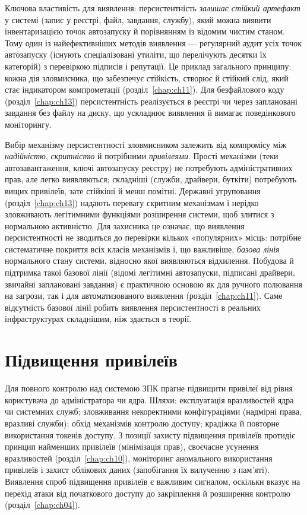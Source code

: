 Ключова властивість для виявлення: персистентність \emph{залишає стійкий артефакт} у системі (запис у реєстрі, файл, завдання, службу), який можна виявити інвентаризацією точок автозапуску й порівнянням із відомим чистим станом. Тому один із найефективніших методів виявлення --- регулярний аудит усіх точок автозапуску (існують спеціалізовані утиліти, що перелічують десятки їх категорій) з перевіркою підписів і репутації. Це приклад загального принципу: кожна дія зловмисника, що забезпечує стійкість, створює й стійкий слід, який стає індикатором компрометації (розділ~\ref{chap:ch11}). Для безфайлового коду (розділ~\ref{chap:ch13}) персистентність реалізується в реєстрі чи через заплановані завдання без файлу на диску, що ускладнює виявлення й вимагає поведінкового моніторингу.

Вибір механізму персистентності зловмисником залежить від компромісу між \emph{надійністю}, \emph{скритністю} й потрібними \emph{привілеями}. Прості механізми (теки автозавантаження, ключі автозапуску реєстру) не потребують адміністративних прав, але легко виявляються; складніші (служби, драйвери, буткіти) потребують вищих привілеїв, зате стійкіші й менш помітні. Державні угруповання (розділ~\ref{chap:ch13}) надають перевагу скритним механізмам і нерідко зловживають легітимними функціями розширення системи, щоб злитися з нормальною активністю. Для захисника це означає, що виявлення персистентності не зводиться до перевірки кількох «популярних» місць: потрібне систематичне покриття всіх класів механізмів і, що важливіше, \emph{базова лінія} нормального стану системи, відносно якої виявляються відхилення. Побудова й підтримка такої базової лінії (відомі легітимні автозапуски, підписані драйвери, звичайні заплановані завдання) є практичною основою як для ручного полювання на загрози, так і для автоматизованого виявлення (розділ~\ref{chap:ch11}). Саме відсутність базової лінії робить виявлення персистентності в реальних інфраструктурах складнішим, ніж здається в теорії.

\section{Підвищення привілеїв}\label{sec:ch05-privesc}

Для повного контролю над системою ЗПК прагне підвищити привілеї від рівня користувача до адміністратора чи ядра. Шляхи: експлуатація вразливостей ядра чи системних служб; зловживання некоректними конфігураціями (надмірні права, вразливі служби); обхід механізмів контролю доступу; крадіжка й повторне використання токенів доступу. З позиції захисту підвищення привілеїв протидіє принцип найменших привілеїв (мінімізація прав), своєчасне усунення вразливостей (розділ~\ref{chap:ch10}), моніторинг аномального використання привілеїв і захист облікових даних (запобігання їх вилученню з пам'яті). Виявлення спроб підвищення привілеїв є важливим сигналом, оскільки вказує на перехід атаки від початкового доступу до закріплення й розширення контролю (розділ~\ref{chap:ch04}).

